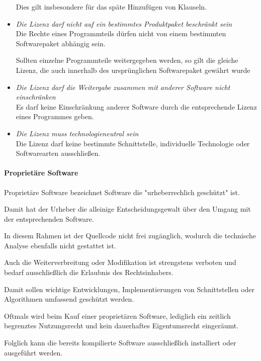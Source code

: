 \begin{itemize}
    Dies gilt insbesondere für das späte Hinzufügen von Klauseln. 

    \item \textit{Die Lizenz darf nicht auf ein bestimmtes Produktpaket beschränkt sein}\\
    Die Rechte eines Programmteils dürfen nicht von einem bestimmten Softwarepaket abhängig sein. 

    Sollten einzelne Programmteile weitergegeben werden, so gilt die gleiche Lizenz, die auch innerhalb des ursprünglichen Softwarepaket gewährt wurde

    \item \textit{Die Lizenz darf die Weitergabe zusammen mit anderer Software nicht einschränken}\\
    Es darf keine Einschränkung anderer Software durch die entsprechende Lizenz eines Programmes geben.

    \item \textit{Die Lizenz muss technologieneutral sein}\\
    Die Lizenz darf keine bestimmte Schnittstelle, individuelle Technologie oder Softwarearten ausschließen. 

\end{itemize}

\paragraph{Proprietäre Software}
Proprietäre Software bezeichnet Software die "urheberrechlich geschützt" ist. 

Damit hat der Urheber die alleinige Entscheidungsgewalt über den Umgang mit der entsprechenden Software. 

In diesem Rahmen ist der Quellcode nicht frei zugänglich, wodurch die technische Analyse ebenfalls nicht gestattet ist. 

Auch die Weiterverbreitung oder Modifikation ist strengstens verboten und bedarf ausschließlich die Erlaubnis des Rechtsinhabers.  

Damit sollen wichtige Entwicklungen, Implementierungen von Schnittstellen oder Algorithmen umfassend geschützt werden. 

Oftmals wird beim Kauf einer proprietären Software, lediglich ein zeitlich begrenztes Nutzungsrecht und kein dauerhaftes Eigentumsrecht eingeräumt. 

Folglich kann die bereits kompilierte Software ausschließlich installiert oder ausgeführt werden. 

